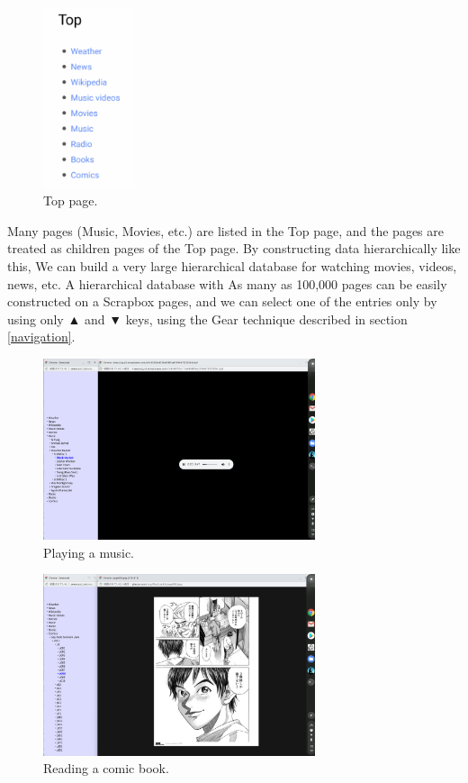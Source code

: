 \documentclass[conference]{IEEEtran}
\def\up{▲}
\def\down{▼}
\def\SB{Scrapbox}
\begin{document}
\begin{figure}[H]
\centerline{\includegraphics[width=27mm,bb=0 0 262 515]{figures/5a644f357ba6a6b81b011e200019d736.png}}
\caption{Top page.}
\label{top}
\end{figure}

Many pages (Music, Movies, etc.) are listed in the Top page, and
the pages are treated as children pages of the Top page.
By constructing data hierarchically like this,
We can build a very large hierarchical database for watching movies, videos, news, etc.
A hierarchical database with
As many as 100,000 pages can be easily constructed on a {\SB} pages, and
we can select one of the entries only by using only {\up} and {\down} keys,
using the Gear technique described in section \ref{navigation}.

\begin{figure}[H]
\centerline{\includegraphics[width=80mm,bb=0 0 2400 1600]{figures/blackmarket.png}}
\caption{Playing a music.}
\label{blackmarket}
\end{figure}

\begin{figure}[H]
\centerline{\includegraphics[width=80mm,bb=0 0 2400 1600]{figures/blackjack.png}}
\caption{Reading a comic book.}
\label{blackjack}
\end{figure}
\end{document}
